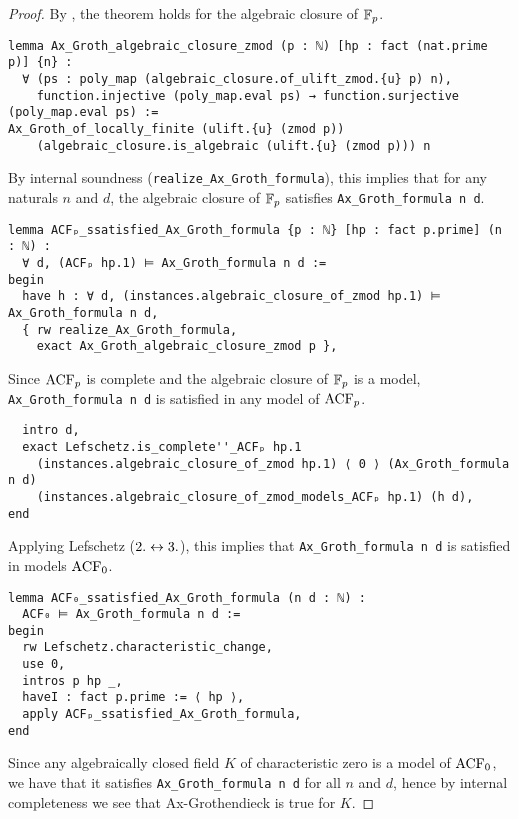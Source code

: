 \begin{proof}
By ,
the theorem holds for the algebraic closure of $\mathbb{F}_{p}$.
\begin{lstlisting}
lemma Ax_Groth_algebraic_closure_zmod (p : ℕ) [hp : fact (nat.prime p)] {n} :
  ∀ (ps : poly_map (algebraic_closure.of_ulift_zmod.{u} p) n),
    function.injective (poly_map.eval ps) → function.surjective (poly_map.eval ps) :=
Ax_Groth_of_locally_finite (ulift.{u} (zmod p))
    (algebraic_closure.is_algebraic (ulift.{u} (zmod p))) n \end{lstlisting}

By internal soundness (\texttt{realize\_Ax\_Groth\_formula}),
this implies that for any naturals $n$ and $d$,
the algebraic closure of $\mathbb{F}_{p}$ satisfies \texttt{Ax\_Groth\_formula n d}.

\begin{lstlisting}
lemma ACFₚ_ssatisfied_Ax_Groth_formula {p : ℕ} [hp : fact p.prime] (n : ℕ) :
  ∀ d, (ACFₚ hp.1) ⊨ Ax_Groth_formula n d :=
begin
  have h : ∀ d, (instances.algebraic_closure_of_zmod hp.1) ⊨ Ax_Groth_formula n d,
  { rw realize_Ax_Groth_formula,
    exact Ax_Groth_algebraic_closure_zmod p }, \end{lstlisting}

Since $\operatorname{ACF}_{p}$ is complete and the algebraic closure of $\mathbb{F}_{p}$ is a model,
\texttt{Ax\_Groth\_formula n d} is satisfied in any model of $\operatorname{ACF}_{p}$.

\begin{lstlisting}
  intro d,
  exact Lefschetz.is_complete''_ACFₚ hp.1
    (instances.algebraic_closure_of_zmod hp.1) ⟨ 0 ⟩ (Ax_Groth_formula n d)
    (instances.algebraic_closure_of_zmod_models_ACFₚ hp.1) (h d),
end \end{lstlisting}

Applying Lefschetz ($2. \leftrightarrow 3.$), this implies that \texttt{Ax\_Groth\_formula n d}
is satisfied in models $\operatorname{ACF}_{0}$.

\begin{lstlisting}
lemma ACF₀_ssatisfied_Ax_Groth_formula (n d : ℕ) :
  ACF₀ ⊨ Ax_Groth_formula n d :=
begin
  rw Lefschetz.characteristic_change,
  use 0,
  intros p hp _,
  haveI : fact p.prime := ⟨ hp ⟩,
  apply ACFₚ_ssatisfied_Ax_Groth_formula,
end \end{lstlisting}

Since any algebraically closed field $K$ of characteristic zero is a model of $\operatorname{ACF}_{0}$,
we have that it satisfies \texttt{Ax\_Groth\_formula n d} for all $n$ and $d$,
hence by internal completeness we see that Ax-Grothendieck is true for $K$.


\end{proof}
